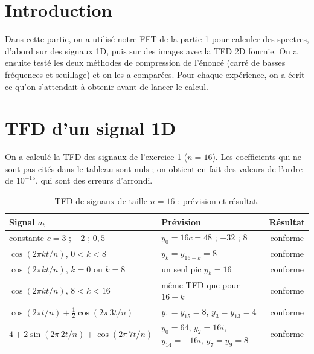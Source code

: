 \documentclass[11pt,a4paper]{article}
\begin{document}
\tableofcontents
\newpage
{}


\section{Introduction}

Dans cette partie, on a utilisé notre FFT de la partie 1 pour calculer des spectres,
d'abord sur des signaux 1D, puis sur des images avec la TFD 2D fournie. On a ensuite
testé les deux méthodes de compression de l'énoncé (carré de basses fréquences et
seuillage) et on les a comparées. Pour chaque expérience, on a écrit ce qu'on
s'attendait à obtenir avant de lancer le calcul.

\section{TFD d'un signal 1D}

On a calculé la TFD des signaux de l'exercice 1 ($n = 16$). Les coefficients qui ne
sont pas cités dans le tableau sont nuls ; on obtient en fait des valeurs de l'ordre
de $10^{-15}$, qui sont des erreurs d'arrondi.

\begin{table}[H]
\centering
\caption{TFD de signaux de taille $n = 16$ : prévision et résultat.}
\label{tab:1d}
\begin{tabular}{|l|l|c|}
\hline
\textbf{Signal $a_t$} & \textbf{Prévision} & \textbf{Résultat} \\
\hline
constante $c = 3$ ; $-2$ ; $0{,}5$ & $y_0 = 16c = 48$ ; $-32$ ; $8$ & conforme \\
\hline
$\cos(2\pi k t/n)$, $0 < k < 8$ & $y_k = y_{16-k} = 8$ & conforme \\
\hline
$\cos(2\pi k t/n)$, $k = 0$ ou $k = 8$ & un seul pic $y_k = 16$ & conforme \\
\hline
$\cos(2\pi k t/n)$, $8 < k < 16$ & même TFD que pour $16-k$ & conforme \\
\hline
$\cos(2\pi t/n) + \frac12 \cos(2\pi\, 3t/n)$ & $y_1 = y_{15} = 8$, $y_3 = y_{13} = 4$ & conforme \\
\hline
$4 + 2\sin(2\pi\, 2t/n) + \cos(2\pi\, 7t/n)$ &
  $y_0 = 64$, $y_2 = 16i$, $y_{14} = -16i$, $y_7 = y_9 = 8$ & conforme \\
\hline
\end{tabular}
\end{table}
\end{document}
